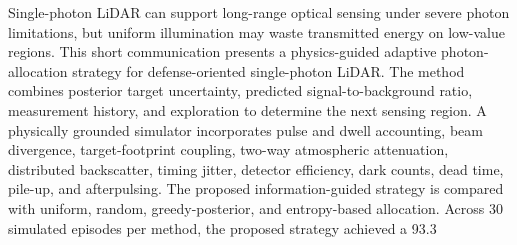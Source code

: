 Single-photon LiDAR can support long-range optical sensing under severe photon limitations, but uniform illumination may waste transmitted energy on low-value regions. This short communication presents a physics-guided adaptive photon-allocation strategy for defense-oriented single-photon LiDAR. The method combines posterior target uncertainty, predicted signal-to-background ratio, measurement history, and exploration to determine the next sensing region. A physically grounded simulator incorporates pulse and dwell accounting, beam divergence, target-footprint coupling, two-way atmospheric attenuation, distributed backscatter, timing jitter, detector efficiency, dark counts, dead time, pile-up, and afterpulsing. The proposed information-guided strategy is compared with uniform, random, greedy-posterior, and entropy-based allocation. Across 30 simulated episodes per method, the proposed strategy achieved a 93.3%
